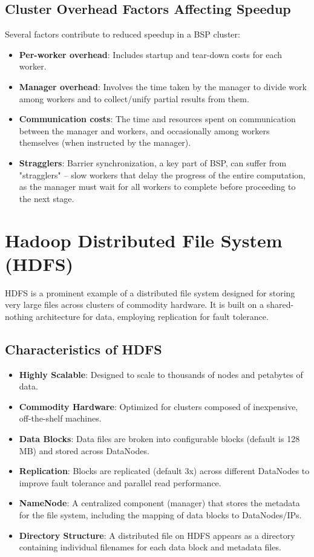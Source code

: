 \documentclass{article}
\begin{document}
\subsection*{Cluster Overhead Factors Affecting Speedup}
Several factors contribute to reduced speedup in a BSP cluster:
\begin{itemize}
    \item \textbf{Per-worker overhead}: Includes startup and tear-down costs for each worker.
    \item \textbf{Manager overhead}: Involves the time taken by the manager to divide work among workers and to collect/unify partial results from them.
    \item \textbf{Communication costs}: The time and resources spent on communication between the manager and workers, and occasionally among workers themselves (when instructed by the manager).
    \item \textbf{Stragglers}: Barrier synchronization, a key part of BSP, can suffer from "stragglers" – slow workers that delay the progress of the entire computation, as the manager must wait for all workers to complete before proceeding to the next stage.
\end{itemize}

\section*{Hadoop Distributed File System (HDFS)}
HDFS is a prominent example of a distributed file system designed for storing very large files across clusters of commodity hardware. It is built on a shared-nothing architecture for data, employing replication for fault tolerance.

\subsection*{Characteristics of HDFS}
\begin{itemize}
    \item \textbf{Highly Scalable}: Designed to scale to thousands of nodes and petabytes of data.
    \item \textbf{Commodity Hardware}: Optimized for clusters composed of inexpensive, off-the-shelf machines.
    \item \textbf{Data Blocks}: Data files are broken into configurable blocks (default is 128 MB) and stored across DataNodes.
    \item \textbf{Replication}: Blocks are replicated (default 3x) across different DataNodes to improve fault tolerance and parallel read performance.
    \item \textbf{NameNode}: A centralized component (manager) that stores the metadata for the file system, including the mapping of data blocks to DataNodes/IPs.
    \item \textbf{Directory Structure}: A distributed file on HDFS appears as a directory containing individual filenames for each data block and metadata files.
\end{itemize}
\end{document}
